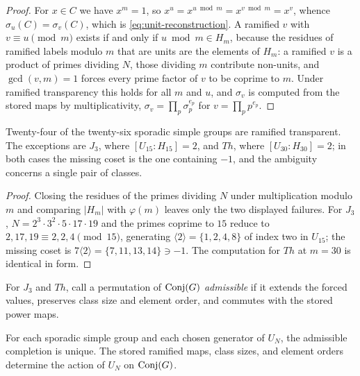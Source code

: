 \begin{proof}
For \(x\in C\) we have \(x^m=1\), so \(x^u=x^{u\bmod m}=x^{v\bmod m}=x^v\),
whence \(\sigma_u(C)=\sigma_v(C)\), which is
\eqref{eq:unit-reconstruction}.  A ramified \(v\) with \(v\equiv u\pmod m\)
exists if and only if \(u\bmod m\in H_m\), because the residues of ramified
labels modulo \(m\) that are units are the elements of \(H_m\):
a ramified \(v\) is a product of primes dividing \(N\), those dividing \(m\)
contribute non-units, and \(\gcd(v,m)=1\) forces every prime factor of \(v\)
to be coprime to \(m\).  Under ramified transparency this holds for all
\(m\) and \(u\), and \(\sigma_v\) is computed from the stored maps by
multiplicativity, \(\sigma_v=\prod_p\sigma_p^{e_p}\) for \(v=\prod_pp^{e_p}\).
\end{proof}

\begin{proposition}
\label{prop:reconstruction-coverage}
Twenty-four of the twenty-six sporadic simple groups are ramified
transparent.  The exceptions are \(J_3\), where
\([U_{15}:H_{15}]=2\), and \(Th\), where \([U_{30}:H_{30}]=2\); in both cases
the missing coset is the one containing \(-1\), and the ambiguity concerns a
single pair of classes.
\end{proposition}

\begin{proof}
Closing the residues of the primes dividing \(N\) under multiplication
modulo \(m\) and comparing \(|H_m|\) with \(\varphi(m)\) leaves only the two
displayed failures.  For \(J_3\), \(N=2^3\cdot3^2\cdot
5\cdot17\cdot19\) and the primes coprime to \(15\) reduce to
\(2,17,19\equiv2,2,4\pmod{15}\), generating
\(\langle2\rangle=\{1,2,4,8\}\) of index two in \(U_{15}\); the missing coset
is \(7\langle2\rangle=\{7,11,13,14\}\ni-1\).  The computation for \(Th\) at
\(m=30\) is identical in form.
\end{proof}

For \(J_3\) and \(Th\), call a permutation of \(\operatorname{Conj}(G)\)
\emph{admissible} if it extends the forced values, preserves class size and
element order, and commutes with the stored power maps.

\begin{proposition}
\label{prop:ambiguity-harmless}
For each sporadic simple group and each chosen generator of \(U_N\), the
admissible completion is unique.  The stored ramified maps, class sizes, and
element orders determine the action of \(U_N\) on \(\operatorname{Conj}(G)\).
\end{proposition}

